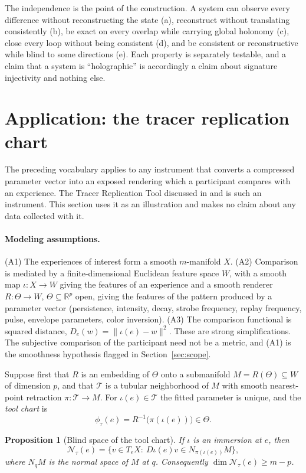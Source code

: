 \documentclass[11pt]{article}
\newtheorem{proposition}{Proposition}
\theoremstyle{remark}
\newcommand{\R}{\mathbb{R}}
\newcommand{\N}{\mathcal{N}}
\begin{document}
The independence is the point of the construction. A system can observe every difference without reconstructing the state (a), reconstruct without translating consistently (b), be exact on every overlap while carrying global holonomy (c), close every loop without being consistent (d), and be consistent or reconstructive while blind to some directions (e). Each property is separately testable, and a claim that a system is ``holographic'' is accordingly a claim about signature injectivity and nothing else.

\section{Application: the tracer replication chart}

The preceding vocabulary applies to any instrument that converts a compressed parameter vector into an exposed rendering which a participant compares with an experience. The Tracer Replication Tool discussed in \cite{flyxion} and \cite{qri_note} is such an instrument. This section uses it as an illustration and makes no claim about any data collected with it.

\paragraph{Modeling assumptions.} (A1) The experiences of interest form a smooth $m$-manifold $X$. (A2) Comparison is mediated by a finite-dimensional Euclidean feature space $W$, with a smooth map $\iota:X\to W$ giving the features of an experience and a smooth renderer $R:\Theta\to W$, $\Theta\subseteq\R^p$ open, giving the features of the pattern produced by a parameter vector (persistence, intensity, decay, strobe frequency, replay frequency, pulse, envelope parameters, color inversion). (A3) The comparison functional is squared distance, $D_e(w)=\|\iota(e)-w\|^2$. These are strong simplifications. The subjective comparison of the participant need not be a metric, and (A1) is the smoothness hypothesis flagged in Section~\ref{sec:scope}.

Suppose first that $R$ is an embedding of $\Theta$ onto a submanifold $M=R(\Theta)\subseteq W$ of dimension $p$, and that $\mathcal T$ is a tubular neighborhood of $M$ with smooth nearest-point retraction $\pi:\mathcal T\to M$. For $\iota(e)\in\mathcal T$ the fitted parameter is unique, and the \emph{tool chart} is
\[
\phi_\tau(e)=R^{-1}\bigl(\pi(\iota(e))\bigr)\in\Theta .
\]

\begin{proposition}[Blind space of the tool chart]
If $\iota$ is an immersion at $e$, then
\[
\N_\tau(e)=\bigl\{v\in T_eX:\ D\iota(e)v\in N_{\pi(\iota(e))}M\bigr\},
\]
where $N_qM$ is the normal space of $M$ at $q$. Consequently $\dim\N_\tau(e)\ge m-p$.
\end{proposition}
\end{document}
